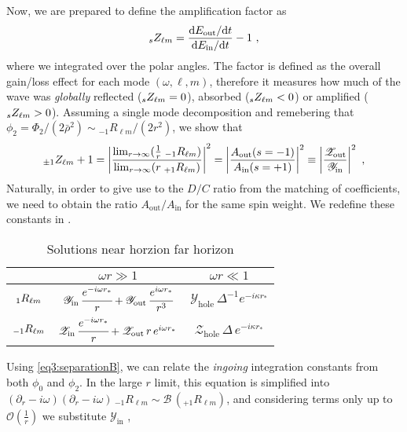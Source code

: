 Now, we are prepared to define the amplification factor as 
\begin{align}
    \label{eq3:Zdef}
    \uu[s]{Z}{\ell m} = \frac{\dd E_\mathrm{out} / \dd t}{\dd E_\mathrm{in} / \dd t} - 1 ~,
\end{align}
where we integrated over the polar angles.
The factor is defined as the overall gain/loss effect for each mode $(\omega,\ell,m)$, therefore it measures how much of the wave was \emph{globally} reflected ($\uu[s]{Z}{\ell m}=0$), absorbed ($\uu[s]{Z}{\ell m}<0$) or amplified ($\uu[s]{Z}{\ell m}>0$).
Assuming a single mode decomposition and remebering that $\phi_2 = \Phi_2/(2 \bar{\rho}^2) \sim {}_{-1}R_{\ell m}/(2 r^2)$, we show that
\begin{align}
    \label{eq3:ZfactorAout2Ain0}
    \uu[\pm1]{Z}{\ell m} +1= \left| \frac{\lim_{r\to\infty} (\tfrac{1}{r} \; {}_{-1}R_{\ell m} )}{\lim_{r\to\infty} ( r \; {}_{+1}R_{\ell m} )} \right|^2 = \left| \frac{A_\mathrm{out}(s=-1)}{A_\mathrm{in}(s=+1)} \right|^2 \equiv \left| \frac{\mathscr{Z}_\mathrm{out}}{\mathscr{Y}_\mathrm{in}} \right|^2 ~,
\end{align}
Naturally, in order to give use to the $D/C$ ratio from the matching of coefficients, we need to obtain the ratio $A_\mathrm{out}/A_\mathrm{in}$ for the same spin weight. We redefine these constants in .
\begin{table}[h]
	\centering
	\tabulinesep=1.5mm
    \begin{tabu}{@{\hskip 0.25cm}c@{\hskip 0.75cm}c@{\hskip 0.75cm}c@{\hskip 0.25cm}}
        \hline
         & $\omega r \gg 1$ & $\omega r \ll 1$ \\
		\hline\hline
        $\uu[1]{R}{\ell m}$ & $\mathscr{Y}_\mathrm{in}\,\cfrac{e^{-i \omega r_*}}{r} + \mathscr{Y}_\mathrm{out}\, \cfrac{e^{i \omega r_*}}{r^3}$ & $\mathscr{Y}_\mathrm{hole} \,\Delta^{-1} e^{-i \kappa r_{*}}$  \\
		\hline
        $\uu[-1]{R}{\ell m}$ & $\mathscr{Z}_\mathrm{in}\,\cfrac{e^{-i \omega r_*}}{r} + \mathscr{Z}_\mathrm{out}\, r \,e^{i \omega r_*}$ & $\mathscr{Z}_\mathrm{hole} \,\Delta \,e^{-i \kappa r_{*}}$ \\
        \hline
    \end{tabu}
    \caption{Solutions near horzion far horizon}
    \label{tb3:approximatedRsolutionsYZ}
\end{table}
Using \eqref{eq3:separationB}, we can relate the \emph{ingoing} integration constants from both $\phi_0$ and $\phi_2$.
In the large $r$ limit, this equation is simplified into $(\partial_r-i \omega)(\partial_r-i \omega) \,{}_{-1}R_{\ell m} \sim \mathscr{B} \,( {}_{+1}R_{\ell m} )$, and considering terms only up to $\mathscr{O}(\tfrac{1}{r})$ we substitute $\mathscr{Y}_\mathrm{in}$ \cite{Teukolsky1974},
